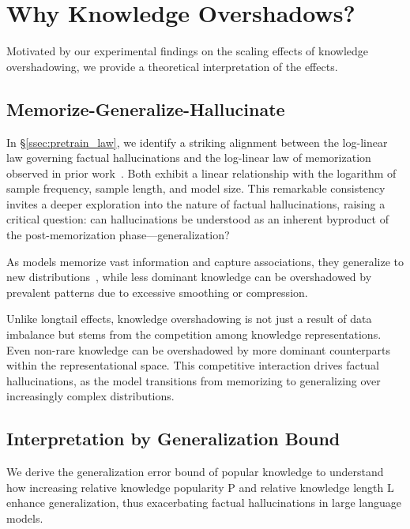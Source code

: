 \section{Why Knowledge Overshadows?}
\label{sec:interpret}
Motivated by our experimental findings on the scaling effects of knowledge overshadowing, we provide a theoretical interpretation of the effects. 
% 
\subsection{Memorize-Generalize-Hallucinate}
\label{ssec:m-g-h}



In \S\ref{ssec:pretrain_law}, we identify a striking alignment between the log-linear law governing factual hallucinations and the log-linear law of memorization observed in prior work~\cite{carlini2022quantifying}. Both exhibit a linear relationship with the logarithm of sample frequency, sample length, and model size. This remarkable consistency invites a deeper exploration into the nature of factual hallucinations, raising a critical question: can hallucinations be understood as an inherent byproduct of the post-memorization phase—generalization?

As models memorize vast information and capture associations, they generalize to new distributions~\cite{baek2024geneft}, while less dominant knowledge can be overshadowed by prevalent patterns due to excessive smoothing or compression. 

Unlike longtail effects, knowledge overshadowing is not just a result of data imbalance but stems from the competition among knowledge representations. Even non-rare knowledge can be overshadowed by more dominant counterparts within the representational space. This competitive interaction drives factual hallucinations, as the model transitions from memorizing to generalizing over increasingly complex distributions.



\subsection{Interpretation by Generalization Bound}
\label{ssec:generalization_error_bound}


We derive the generalization error bound of popular knowledge to understand how increasing relative knowledge popularity $\text{P}$ and relative knowledge length $\text{L}$ enhance generalization, thus exacerbating factual hallucinations in large language models.

